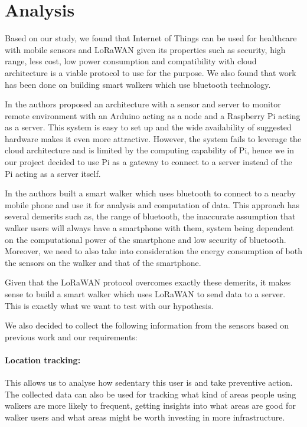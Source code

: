 \chapter{Analysis}
\label{cha:analysis}

Based on our study, we found that Internet of Things can be used for healthcare with mobile sensors and LoRaWAN given its properties such as  security, high range, less cost, low power consumption and compatibility with cloud architecture is a viable protocol to use for the purpose. We also found that work has been done on building smart walkers which use bluetooth technology.

In \cite{erdoush2014wireless} the authors proposed an architecture with a sensor and server to monitor remote environment with an Arduino acting as a node and a Raspberry Pi acting as a server. This system is easy to set up and the wide availability of suggested hardware makes it even more attractive. However, the system fails to leverage the cloud architecture and is limited by the computing capability of Pi, hence we in our project decided to use Pi as a gateway to connect to a server instead of the Pi acting as a server itself.


In \cite{postolache2011smart} the authors built a smart walker which uses bluetooth to connect to a nearby mobile phone and use it for analysis and computation of data. This approach has several demerits such as, the range of bluetooth, the inaccurate assumption that walker users will always have a smartphone with them, system being dependent on the computational power of the smartphone and low security of bluetooth. Moreover, we need to also take into consideration the energy consumption of both the sensors on the walker and that of the smartphone.

Given that the LoRaWAN protocol overcomes exactly these demerits, it makes sense to build a smart walker which uses LoRaWAN to send data to a server.
This is exactly what we want to test with our hypothesis.

We also decided to collect the following information from the sensors based on previous work \cite{postolache2011smart} and our requirements: 

\subsubsection{Location tracking:}
This allows us to analyse how sedentary this user is and take preventive action. The collected data can also be used for tracking what kind of areas people using walkers are more likely to frequent, getting insights into what areas are good for walker users and what areas might be worth investing in more infrastructure.

